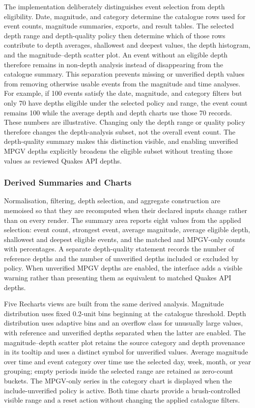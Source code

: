 \documentclass[12pt]{article}
\begin{document}
The implementation deliberately distinguishes event selection from depth eligibility. Date, magnitude, and category determine the catalogue rows used for event counts, magnitude summaries, exports, and result tables. The selected depth range and depth-quality policy then determine which of those rows contribute to depth averages, shallowest and deepest values, the depth histogram, and the magnitude--depth scatter plot. An event without an eligible depth therefore remains in non-depth analysis instead of disappearing from the catalogue summary. This separation prevents missing or unverified depth values from removing otherwise usable events from the magnitude and time analyses. For example, if 100 events satisfy the date, magnitude, and category filters but only 70 have depths eligible under the selected policy and range, the event count remains 100 while the average depth and depth charts use those 70 records. These numbers are illustrative. Changing only the depth range or quality policy therefore changes the depth-analysis subset, not the overall event count. The depth-quality summary makes this distinction visible, and enabling unverified MPGV depths explicitly broadens the eligible subset without treating those values as reviewed Quakes API depths.

\subsubsection{Derived Summaries and Charts}

Normalisation, filtering, depth selection, and aggregate construction are memoised so that they are recomputed when their declared inputs change rather than on every render. The summary area reports eight values from the applied selection: event count, strongest event, average magnitude, average eligible depth, shallowest and deepest eligible events, and the matched and MPGV-only counts with percentages. A separate depth-quality statement records the number of reference depths and the number of unverified depths included or excluded by policy. When unverified MPGV depths are enabled, the interface adds a visible warning rather than presenting them as equivalent to matched Quakes API depths.

Five Recharts views are built from the same derived analysis. Magnitude distribution uses fixed 0.2-unit bins beginning at the catalogue threshold. Depth distribution uses adaptive bins and an overflow class for unusually large values, with reference and unverified depths separated when the latter are enabled. The magnitude--depth scatter plot retains the source category and depth provenance in its tooltip and uses a distinct symbol for unverified values. Average magnitude over time and event category over time use the selected day, week, month, or year grouping; empty periods inside the selected range are retained as zero-count buckets. The MPGV-only series in the category chart is displayed when the include-unverified policy is active. Both time charts provide a brush-controlled visible range and a reset action without changing the applied catalogue filters.
\end{document}
